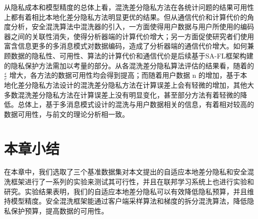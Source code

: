 从隐私成本和模型精度的总体上看，混洗差分隐私方法在各统计问题的结果可用性上都有着相比本地化差分隐私方法明显更优的结果。但从通信代价和计算代价的角度分析，安全混洗算法中混洗器的引入，一方面使得用户数据与用户所使用的编码器之间的关联性消失，使得分析器端的计算代价增大；另一方面促使研究者们使用富含信息更多的多消息模式对数据编码，造成了分析器端的通信代价增大。如何兼顾数据的隐私性、可用性、算法的计算代价和通信代价是后续基于SA-FL框架构建的隐私保护方法需加以考量的部分。从各混洗差分隐私算法评估的结果看，随着的$\frac{\epsilon}{c}$
增大，各方法的数据可用性均会得到提高；而随着用户数据 n 的增加，基于本地化差分隐私方法设计的混洗差分隐私方法在计算误差上会有轻微的增加，其他大多数混洗差分隐私方法在计算误差上没有明显变化，甚至部分方法有着轻微的降低。总体上，基于多消息模式设计的混洗与用户数据相关的信息，有着相对较高的数据可用性，与前文的理论分析相一致。


\section{本章小结}
在本章中，我们选取了三个基准数据集对本文提出的自适应本地差分隐私和安全混洗框架进行了一系列的实验来测试其可行性，并且在联邦学习系统上也进行实验和研究。实验结果表明，我们的自适应本地差分隐私可以有效降低隐私预算，并且维持模型精度。安全混洗框架能通过客户端采样算法和梯度的拆分混洗算法，降低隐私保护预算，提高数据的可用性。

